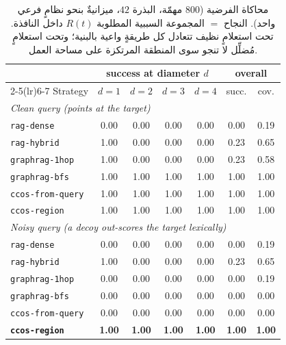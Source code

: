 \documentclass[11pt]{article}
\newcommand{\code}[1]{\textenglish{\texttt{#1}}}
\begin{document}
\begin{table}[h]
\centering
\begin{LTR}
\begin{tabular}{lcccccc}
\toprule
& \multicolumn{4}{c}{\textenglish{success at diameter $d$}} & \multicolumn{2}{c}{\textenglish{overall}} \\
\cmidrule(lr){2-5}\cmidrule(lr){6-7}
\textenglish{Strategy} & $d{=}1$ & $d{=}2$ & $d{=}3$ & $d{=}4$ & \textenglish{succ.} & \textenglish{cov.} \\
\midrule
\multicolumn{7}{l}{\emph{\textenglish{Clean query (points at the target)}}}\\
\code{rag-dense}      & 0.00 & 0.00 & 0.00 & 0.00 & 0.00 & 0.19 \\
\code{rag-hybrid}     & 1.00 & 0.00 & 0.00 & 0.00 & 0.23 & 0.65 \\
\code{graphrag-1hop}  & 1.00 & 0.00 & 0.00 & 0.00 & 0.23 & 0.58 \\
\code{graphrag-bfs}   & 1.00 & 1.00 & 1.00 & 1.00 & 1.00 & 1.00 \\
\code{ccos-from-query}& 1.00 & 1.00 & 1.00 & 1.00 & 1.00 & 1.00 \\
\code{ccos-region}    & 1.00 & 1.00 & 1.00 & 1.00 & 1.00 & 1.00 \\
\midrule
\multicolumn{7}{l}{\emph{\textenglish{Noisy query (a decoy out-scores the target lexically)}}}\\
\code{rag-dense}      & 0.00 & 0.00 & 0.00 & 0.00 & 0.00 & 0.19 \\
\code{rag-hybrid}     & 1.00 & 0.00 & 0.00 & 0.00 & 0.23 & 0.65 \\
\code{graphrag-1hop}  & 0.00 & 0.00 & 0.00 & 0.00 & 0.00 & 0.19 \\
\code{graphrag-bfs}   & 0.00 & 0.00 & 0.00 & 0.00 & 0.00 & 0.00 \\
\code{ccos-from-query}& 0.00 & 0.00 & 0.00 & 0.00 & 0.00 & 0.00 \\
\textbf{\code{ccos-region}} & \textbf{1.00} & \textbf{1.00} & \textbf{1.00} & \textbf{1.00} & \textbf{1.00} & \textbf{1.00} \\
\bottomrule
\end{tabular}
\end{LTR}
\caption{محاكاة الفرضية ($800$ مهمّة، البذرة $42$، ميزانيةٌ بنحو نظامٍ فرعي واحد). النجاح
$=$ المجموعة السببية المطلوبة $R(t)$ داخل النافذة. تحت استعلامٍ نظيف تتعادل كل طريقةٍ واعية
بالبنية؛ وتحت استعلامٍ مُضلِّل لا تنجو سوى المنطقة المرتكزة على مساحة العمل.}
\label{tab:sim}
\end{table}
\end{document}

